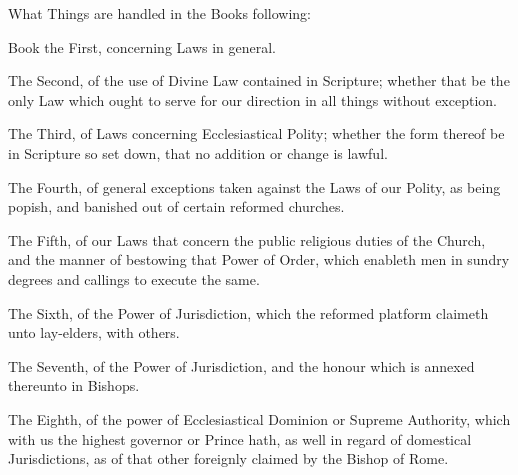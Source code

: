 What Things are handled in the Books following:

Book the First, concerning Laws in general.

The Second, of the use of Divine Law contained in Scripture; whether that be the only Law which ought to serve for our direction in all things without exception.

The Third, of Laws concerning Ecclesiastical Polity; whether the form thereof be in Scripture so set down, that no addition or change is lawful.

The Fourth, of general exceptions taken against the Laws of our Polity, as being popish, and banished out of certain reformed churches.

The Fifth, of our Laws that concern the public religious duties of the Church, and the manner of bestowing that Power of Order, which enableth men in sundry degrees and callings to execute the same.

The Sixth, of the Power of Jurisdiction, which the reformed platform claimeth unto lay-elders, with others.

The Seventh, of the Power of Jurisdiction, and the honour which is annexed thereunto in Bishops.

The Eighth, of the power of Ecclesiastical Dominion or Supreme Authority, which with us the highest governor or Prince hath, as well in regard of domestical Jurisdictions, as of that other foreignly claimed by the Bishop of Rome.
